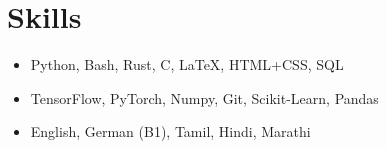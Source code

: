 \section*{Skills}
\begin{itemize}

\item {}\iftoggle{onepage}{\\}{ }Python, Bash, Rust, C, \LaTeX, HTML+CSS, SQL
\item {}\iftoggle{onepage}{\\}{ }TensorFlow, PyTorch, Numpy, Git, Scikit-Learn, Pandas
\item {}\iftoggle{onepage}{\\}{ }English, German (B1), Tamil, Hindi, Marathi

\end{itemize}
